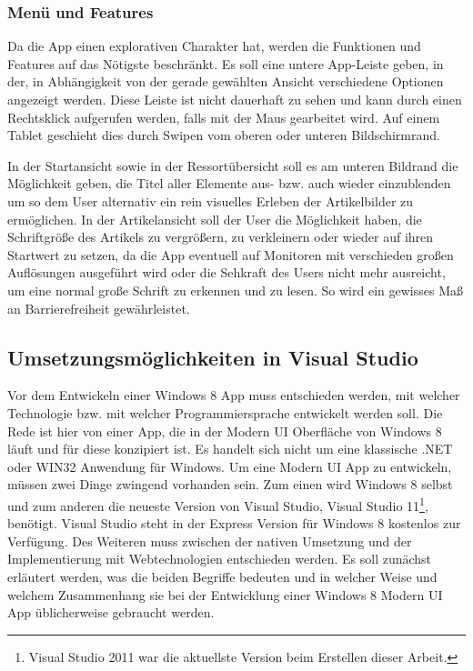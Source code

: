 \documentclass[12pt,a4paper,bibtotoc,abstracton]{scrartcl}
\begin{document}
\subsubsection{Menü und Features}
\label{subsubsec:menuandproperties}
Da die App einen explorativen Charakter hat, werden die Funktionen und Features auf das Nötigste beschränkt. Es soll eine untere App-Leiste geben, in der, in Abhängigkeit von der gerade gewählten Ansicht verschiedene Optionen angezeigt werden. Diese Leiste ist nicht dauerhaft zu sehen und kann durch einen Rechtsklick aufgerufen werden, falls mit der Maus gearbeitet wird. Auf einem Tablet geschieht dies durch Swipen vom oberen oder unteren Bildschirmrand.

In der Startansicht sowie in der Ressortübersicht soll es am unteren Bildrand die Möglichkeit geben, die Titel aller Elemente aus- bzw. auch wieder einzublenden um so dem User alternativ ein rein visuelles Erleben der Artikelbilder zu ermöglichen. In der Artikelansicht soll der User die Möglichkeit haben, die Schriftgröße des Artikels zu vergrößern, zu verkleinern oder wieder auf ihren Startwert zu setzen, da die App eventuell auf Monitoren mit verschieden großen Auflösungen ausgeführt wird oder die Sehkraft des Users nicht mehr ausreicht, um eine normal große Schrift zu erkennen und zu lesen. So wird ein gewisses Maß an Barrierefreiheit gewährleistet. 


\subsection{Umsetzungsmöglichkeiten in Visual Studio}
\label{subsec:nativ_vs_web}
Vor dem Entwickeln einer Windows 8 App muss entschieden werden, mit welcher Technologie bzw. mit welcher Programmiersprache entwickelt werden soll. Die Rede ist hier von einer App, die in der Modern UI Oberfläche von Windows 8 läuft und für diese konzipiert ist. Es handelt sich nicht um eine klassische .NET oder WIN32 Anwendung für Windows. Um eine Modern UI App zu entwickeln, müssen zwei Dinge zwingend vorhanden sein. Zum einen wird Windows 8 selbst und zum anderen die neueste Version von Visual Studio, Visual Studio 11\footnote{Visual Studio 2011 war die aktuellste Version beim Erstellen dieser Arbeit.}, benötigt. Visual Studio steht in der Express Version für Windows 8 kostenlos zur Verfügung. Des Weiteren muss zwischen der nativen Umsetzung und der Implementierung mit Webtechnologien entschieden werden. Es soll zunächst erläutert werden, was die beiden Begriffe bedeuten und in welcher Weise und welchem Zusammenhang sie bei der Entwicklung einer Windows 8 Modern UI App üblicherweise gebraucht werden.
\end{document}
